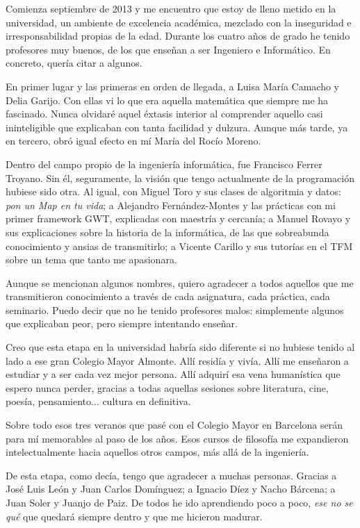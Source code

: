 Comienza septiembre de 2013 y me encuentro que estoy de lleno metido en la universidad, un ambiente de excelencia académica, mezclado con la inseguridad e irresponsabilidad propias de la edad. Durante los cuatro años de grado he tenido profesores muy buenos, de los que enseñan a ser Ingeniero e Informático. En concreto, quería citar a algunos.

En primer lugar y las primeras en orden de llegada, a Luisa María Camacho y Delia Garijo. Con ellas vi lo que era aquella matemática que siempre me ha fascinado. Nunca olvidaré aquel éxtasis interior al comprender aquello casi ininteligible que explicaban con tanta facilidad y dulzura. Aunque más tarde, ya en tercero, obró igual efecto en mí María del Rocío Moreno.

Dentro del campo propio de la ingeniería informática, fue Francisco Ferrer Troyano. Sin él, seguramente, la visión que tengo actualmente de la programación hubiese sido otra. Al igual, con Miguel Toro y sus clases de algoritmia y datos: \textit{pon un Map en tu vida}; a Alejandro Fernández-Montes y las prácticas con mi primer framework GWT, explicadas con maestría y cercanía; a Manuel Rovayo y sus explicaciones sobre la historia de la informática, de las que sobreabunda conocimiento y ansias de transmitirlo; a Vicente Carillo y sus tutorías en el TFM sobre un tema que tanto me apasionara.

Aunque se mencionan algunos nombres, quiero agradecer a todos aquellos que me transmitieron conocimiento a través de cada asignatura, cada práctica, cada seminario. Puedo decir que no he tenido profesores malos: simplemente algunos que explicaban peor, pero siempre intentando enseñar.

Creo que esta etapa en la universidad habría sido diferente si no hubiese tenido al lado a ese gran Colegio Mayor Almonte. Allí residía y vivía. Allí me enseñaron a estudiar y a ser cada vez mejor persona. Allí adquirí esa vena humanística que espero nunca perder, gracias a todas aquellas sesiones sobre literatura, cine, poesía, pensamiento... cultura en definitiva.

Sobre todo esos tres veranos que pasé con el Colegio Mayor en Barcelona serán para mí memorables al paso de los años. Esos cursos de filosofía me expandieron intelectualmente hacia aquellos otros campos, más allá de la ingeniería.

De esta etapa, como decía, tengo que agradecer a muchas personas. Gracias a José Luis León y Juan Carlos Domínguez; a Ignacio Díez y Nacho Bárcena; a Juan Soler y Juanjo de Paiz. De todos he ido aprendiendo poco a poco, \textit{ese no se qué} que quedará siempre dentro y que me hicieron madurar.


